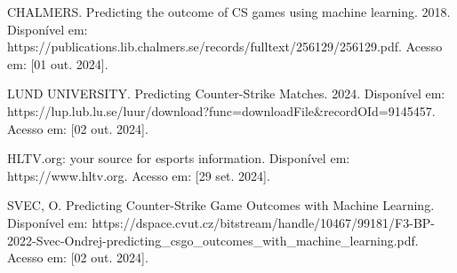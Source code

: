 \documentclass[a4paper,times,12pt]{article}
\begin{document}
\newpage
\begin{thebibliography}{00}

 CHALMERS. Predicting the outcome of CS games using machine learning. 2018. Disponível em: https://publications.lib.chalmers.se/records/fulltext/256129/256129.pdf. Acesso em: [01 out. 2024].

 LUND UNIVERSITY. Predicting Counter-Strike Matches. 2024. Disponível em: https://lup.lub.lu.se/luur/download?func=downloadFile\&recordOId=9145457. Acesso em: [02 out. 2024].

 HLTV.org: your source for esports information. Disponível em: https://www.hltv.org. Acesso em: [29 set. 2024].

 SVEC, O. Predicting Counter-Strike Game Outcomes with Machine Learning. Disponível em: https://dspace.cvut.cz/bitstream/handle/10467/99181/F3-BP-2022-Svec-Ondrej-predicting\_csgo\_outcomes\_with\_machine\_learning.pdf. Acesso em: [02 out. 2024].

\end{thebibliography}
\end{document}
